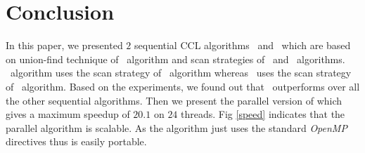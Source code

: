 \section{Conclusion}
\label{conclusion}
In this paper, we presented $2$ sequential CCL algorithms \remsp\ and \aremsp\
which are based on union-find technique of \rems\ algorithm and scan strategies 
of \arun\ and \lrpc\ algorithms. \remsp\ algorithm uses the scan strategy of
\lrpc\ algorithm whereas \arun\ uses the scan strategy of \arun\ algorithm.
Based on the experiments, we found out that \aremsp\ outperforms over all the
other sequential algorithms. Then we present the parallel version of \aremsp
which gives a maximum speedup of $20.1$ on $24$ threads. Fig \ref{speed}
indicates that the parallel algorithm is scalable. As the
algorithm just uses the standard {\em OpenMP} directives thus is easily portable. 